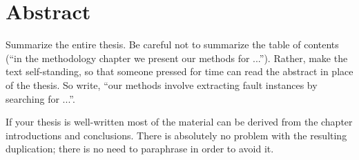 \chapter*{\centering Abstract}
Summarize the entire thesis.
Be careful not to summarize the table of contents
(``in the methodology chapter we present our methods for ...'').
Rather, make the text self-standing, so that someone pressed
for time can read the abstract in place of the thesis.
So write, ``our methods involve extracting fault instances by
searching for ...''.

If your thesis is well-written most of the material can be derived
from the chapter introductions and conclusions.
There is absolutely no problem with the resulting duplication;
there is no need to paraphrase in order to avoid it.

